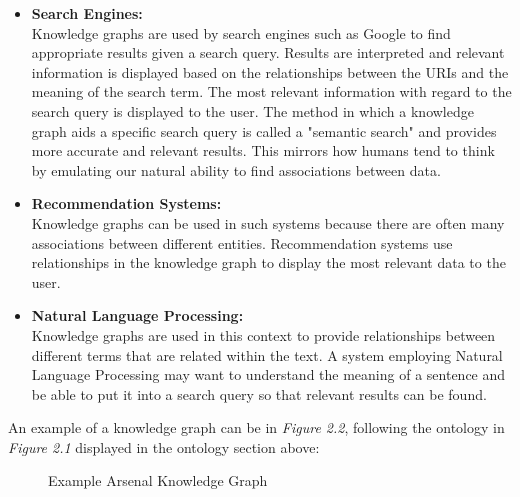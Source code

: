 \vspace{-0.1cm}
\begin{itemize}
    \itemsep0em 
\item \textbf{Search Engines:} \\Knowledge graphs are used by search engines such as Google to find appropriate results given a search query. Results are interpreted and relevant information is displayed based on the relationships between the URIs and the meaning of the search term. The most relevant information with regard to the search query is displayed to the user. The method in which a knowledge graph aids a specific search query is called a "semantic search" and provides more accurate and relevant results. This mirrors how humans tend to think by emulating our natural ability to find associations between data.  \cite{searchengine}  

\item \textbf{Recommendation Systems:} \\Knowledge graphs can be used in such systems because there are often many associations between different entities. Recommendation systems use relationships in the knowledge graph to display the most relevant data to the user. 

\item \textbf{Natural Language Processing:}\\ Knowledge graphs are used in this context to provide relationships between different terms that are related within the text. A system employing Natural Language Processing may want to understand the meaning of a sentence and be able to put it into a search query so that relevant results can be found. 
\end{itemize}

An example of a knowledge graph can be in \textit{Figure 2.2}, following the ontology in \textit{Figure 2.1} displayed in the ontology section above:

\begin{figure}[H]
\begin{center}
\end{center}
\vspace{-0.4cm}
\caption{Example Arsenal Knowledge Graph}
\end{figure}
\vspace{-0.1cm}

